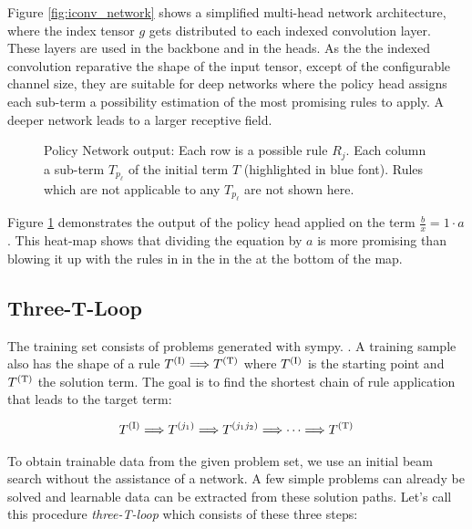 \documentclass{scrartcl}
\theoremstyle{definition}
\begin{document}
Figure \ref{fig:iconv_network} shows a simplified multi-head network architecture, where the index tensor $g$ gets distributed to each indexed convolution layer.
These layers are used in the backbone and in the heads.
As the the indexed convolution reparative the shape of the input tensor, except of the configurable channel size,
they are suitable for deep networks where the policy head assigns each sub-term a possibility estimation of the most promising rules to apply.
A deeper network leads to a larger receptive field.

\begin{figure}[!htbp]
	\centering
	
	\caption{Policy Network output: Each row is a possible rule $R_j$. Each column a sub-term $T_{p_\ell}$ of the initial term $T$ (highlighted in blue font).
	Rules which are not applicable to any $T_{p_\ell}$ are not shown here.
	}
	\label{fig:network_output}
\end{figure}

Figure \ref{fig:network_output} demonstrates the output of the policy head applied on the term $\frac{b}{x}=1\cdot a$.
This heat-map shows that dividing the equation by $a$ is more promising than blowing it up with the rules in in the in the at the bottom of the map.

\subsection{Three-T-Loop}

The training set consists of problems generated with sympy. \cite{10.7717/peerj-cs.103}.
A training sample also has the shape of a rule $T^{(\text I)} \Longrightarrow T^{(\text T)}$ where $T^{(\text I)}$ is the starting point and $T^{(\text T)}$ the solution term.
The goal is to find the shortest chain of rule application that leads to the target term:

\begin{align}
	T^{(\text I)} \Longrightarrow T^{(j_1)} \Longrightarrow T^{(j_1j_2)} \Longrightarrow \cdots \Longrightarrow T^{(\text T)}
	\label{eq:calculation_chain}
\end{align}

To obtain trainable data from the given problem set, we use an initial beam search without the assistance of a network.
A few simple problems can already be solved and learnable data can be extracted from these solution paths.
Let's call this procedure \textit{three-T-loop} which consists of these three steps:
\end{document}
